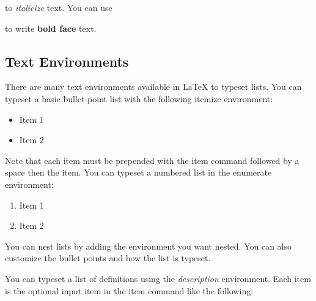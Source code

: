 \begin{center}
\begin{latexcode}
\textit{}
\end{latexcode}
\end{center}

to \textit{italicize} text. You can use

\begin{center}
\begin{latexcode}
\textbf{}
\end{latexcode}
\end{center}

to write \textbf{bold face} text.

\subsection{Text Environments}
There are many text environments available in \LaTeX{} to typeset lists. You can typeset a basic bullet-point list with the following itemize environment:

\begin{center}
\begin{latexcode}
\begin{itemize}
\item Item 1
\item Item 2
\end{itemize}
\end{latexcode}
\end{center}

Note that each item must be prepended with the item command followed by a space then the item. You can typeset a numbered list in the enumerate environment:

\begin{center}
\begin{latexcode}
\begin{enumerate}
\item Item 1
\item Item 2
\end{enumerate}
\end{latexcode}
\end{center}

You can nest lists by adding the environment you want nested. You can also customize the bullet points and how the list is typeset.

You can typeset a list of definitions using the \textit{description} environment. Each item is the optional input item in the item command like the following:

